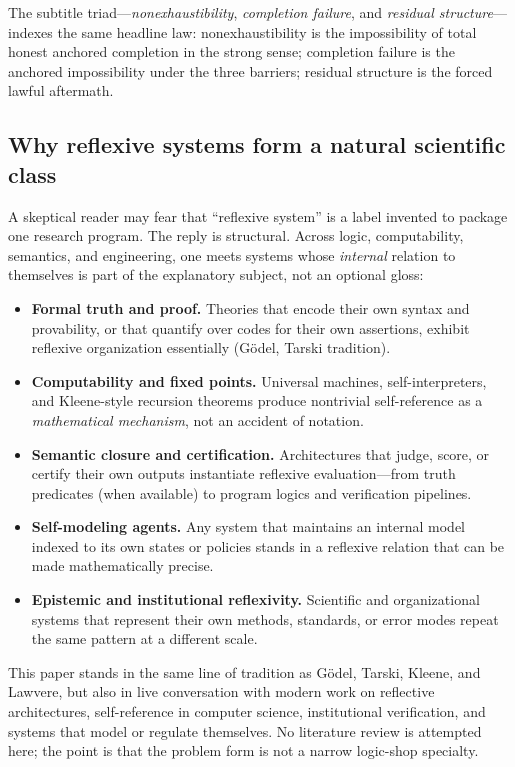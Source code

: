 \documentclass[11pt]{article}
\theoremstyle{plain}
\theoremstyle{definition}
\theoremstyle{remark}
\begin{document}
\noindent The subtitle triad---\emph{nonexhaustibility}, \emph{completion failure}, and \emph{residual structure}---indexes the same headline law: nonexhaustibility is the impossibility of total honest anchored completion in the strong sense; completion failure is the anchored impossibility under the three barriers; residual structure is the forced lawful aftermath.

\subsection{Why reflexive systems form a natural scientific class}

A skeptical reader may fear that ``reflexive system'' is a label invented to package one research program. The reply is structural. Across logic, computability, semantics, and engineering, one meets systems whose \emph{internal} relation to themselves is part of the explanatory subject, not an optional gloss:
\begin{itemize}[leftmargin=1.5em]
\item \textbf{Formal truth and proof.} Theories that encode their own syntax and provability, or that quantify over codes for their own assertions, exhibit reflexive organization essentially (Gödel, Tarski tradition).
\item \textbf{Computability and fixed points.} Universal machines, self-interpreters, and Kleene-style recursion theorems produce nontrivial self-reference as a \emph{mathematical mechanism}, not an accident of notation.
\item \textbf{Semantic closure and certification.} Architectures that judge, score, or certify their own outputs instantiate reflexive evaluation---from truth predicates (when available) to program logics and verification pipelines.
\item \textbf{Self-modeling agents.} Any system that maintains an internal model indexed to its own states or policies stands in a reflexive relation that can be made mathematically precise.
\item \textbf{Epistemic and institutional reflexivity.} Scientific and organizational systems that represent their own methods, standards, or error modes repeat the same pattern at a different scale.
\end{itemize}

This paper stands in the same line of tradition as Gödel, Tarski, Kleene, and Lawvere, but also in live conversation with modern work on reflective architectures, self-reference in computer science, institutional verification, and systems that model or regulate themselves. No literature review is attempted here; the point is that the problem form is not a narrow logic-shop specialty.
\end{document}
